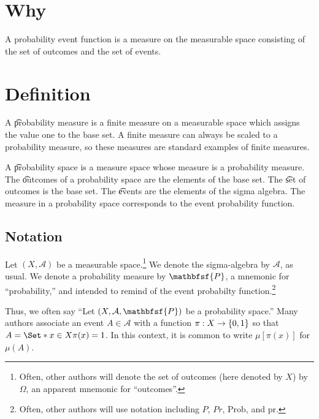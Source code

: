 
\section*{Why}

A probability event function is a measure on the measurable space consisting of the set of outcomes and the set of events.

\section*{Definition}

A \t{probability measure} is a finite measure on a measurable space which assigns the value one to the base set.
A finite measure can always be scaled to a probability measure, so these measures are standard examples of finite measures.

A \t{probability space} is a measure space whose measure is a probability measure.
The \t{outcomes} of a probability space are the elements of the base set.
The \t{set of outcomes} is the base set.
The \t{events} are the elements of the sigma algebra.
The measure in a probability space corresponds to the event probability function.

\subsection*{Notation}

Let $(X, \mathcal{A} )$ be a measurable space.\footnote{Often, other authors will denote the set of outcomes (here denoted by $X$) by $\Omega $, an apparent mnemonic for ``outcomes''.}
We denote the sigma-algebra by $\mathcal{A} $, as usual.
We denote a probability measure by $\mathbfsf{P} $, a mnemonic for ``probability,'' and intended to remind of the event probabilty function.\footnote{Often, other authors will use notation including $P$, $Pr$, $\text{Prob}$, and $\text{pr}$.}

Thus, we often say ``Let $(X, \mathcal{A} , \mathbfsf{P} )$ be a probability space.''
Many authors associate an event $A \in \mathcal{A} $ with a function $\pi : X \to \{0, 1\}$ so that $A = \Set*{x \in X}{\pi (x) = 1}$.
In this context, it is common to write $\mu [\pi (x)]$ for $\mu (A)$.

\blankpage